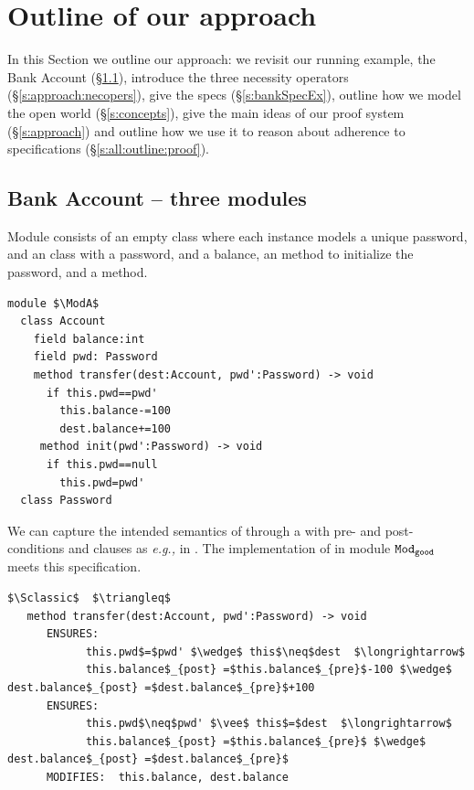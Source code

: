 

\section{Outline of our approach}
\label{s:outline}
 
In this Section we outline our approach:  
we  revisit  our running example, the Bank Account (\S\ref{s:bank}),  
introduce the three necessity operators (\S \ref{s:approach:necopers}),  give 
the \Nec specs (\S \ref{s:bankSpecEx}),
   outline how we model the open world (\S\ref{s:concepts}), 
give the main ideas of our proof system (\S\ref{s:approach})
and   outline 
how we use it to reason 
about adherence to \Nec specifications  (\S\ref{s:all:outline:proof}).
 

 \subsection{Bank Account -- three modules}
\label{s:bank}
  
Module \ModA consists of an empty 
 class where each instance models a unique password, and an   class with a password, and a balance, an  method to 
initialize the password, and 
a
 method. 
%
%
%
%
% 
\begin{lstlisting}[mathescape=true, language=Chainmail, frame=lines]
module $\ModA$
  class Account
    field balance:int 
    field pwd: Password
    method transfer(dest:Account, pwd':Password) -> void
      if this.pwd==pwd'
        this.balance-=100
        dest.balance+=100
     method init(pwd':Password) -> void
      if this.pwd==null
        this.pwd=pwd'
  class Password
\end{lstlisting}
%
\noindent 
We can capture the intended semantics of     
through  {a}  \funcSpec with pre- and post- conditions and  clauses as \emph{e.g.,} in \citeauthor{Leavens-etal07,dafny13}.
The implementation of   in module  ${\texttt{Mod}}_{{\texttt{good}}}$ meets
this specification.

\begin{lstlisting}[mathescape=true, frame=lines, language=Chainmail]
$\Sclassic$  $\triangleq$
   method transfer(dest:Account, pwd':Password) -> void  
      ENSURES:
            this.pwd$=$pwd' $\wedge$ this$\neq$dest  $\longrightarrow$  
            this.balance$_{post} =$this.balance$_{pre}$-100 $\wedge$ dest.balance$_{post} =$dest.balance$_{pre}$+100
      ENSURES:
            this.pwd$\neq$pwd' $\vee$ this$=$dest  $\longrightarrow$ 
            this.balance$_{post} =$this.balance$_{pre}$ $\wedge$ dest.balance$_{post} =$dest.balance$_{pre}$ 
      MODIFIES:  this.balance, dest.balance        
\end{lstlisting}
 
